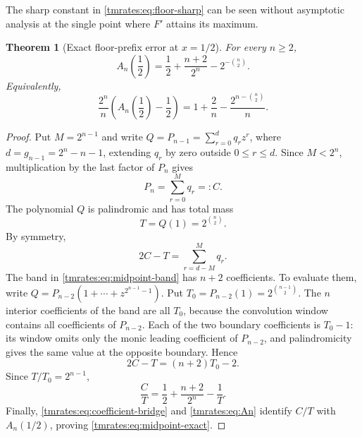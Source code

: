 \documentclass[11pt,oneside]{article}
\newtheorem{theorem}{Theorem}[section]
\theoremstyle{definition}
\theoremstyle{remark}
\begin{document}
The sharp constant in \eqref{tmrates:eq:floor-sharp} can be seen without asymptotic analysis at the
single point where $F'$ attains its maximum.

\begin{theorem}[Exact floor-prefix error at $x=1/2$]
\label{tmrates:thm:midpoint-exact}
For every $n\ge2$,
\begin{equation}
 A_n\!\left(\frac12\right)
 =\frac12+\frac{n+2}{2^n}-2^{-\binom n2}.                 \label{tmrates:eq:midpoint-exact}
\end{equation}
Equivalently,
\begin{equation}
 \frac{2^n}{n}
 \left(A_n\!\left(\frac12\right)-\frac12\right)
 =1+\frac2n-\frac{2^{n-\binom n2}}n.                     \label{tmrates:eq:midpoint-scaled}
\end{equation}
\end{theorem}

\begin{proof}
Put $M=2^{n-1}$ and write $Q=P_{n-1}=\sum_{r=0}^{d}q_rz^r$, where
$d=g_{n-1}=2^n-n-1$, extending $q_r$ by zero outside $0\le r\le d$.  Since $M<2^n$,
multiplication by the last factor of $P_n$ gives
\begin{equation}
 [z^M]P_n=\sum_{r=0}^{M}q_r=:C.                            \label{tmrates:eq:midpoint-C}
\end{equation}
The polynomial $Q$ is palindromic and has total mass
\begin{equation}
 T=Q(1)=2^{\binom n2}.                                     \label{tmrates:eq:midpoint-T}
\end{equation}
By symmetry,
\begin{equation}
 2C-T=\sum_{r=d-M}^{M}q_r.                                 \label{tmrates:eq:midpoint-band}
\end{equation}
The band in \eqref{tmrates:eq:midpoint-band} has $n+2$ coefficients.  To evaluate them, write
$Q=P_{n-2}(1+\cdots+z^{2^{n-1}-1})$.  Put
$T_0=P_{n-2}(1)=2^{\binom{n-1}{2}}$.  The $n$ interior coefficients of the band are all
$T_0$, because the convolution window contains all coefficients of $P_{n-2}$.  Each of the
two boundary coefficients is $T_0-1$: its window omits only the monic leading coefficient of
$P_{n-2}$, and palindromicity gives the same value at the opposite boundary.  Hence
\begin{equation}
 2C-T=(n+2)T_0-2.                                         \label{tmrates:eq:midpoint-band-value}
\end{equation}
Since $T/T_0=2^{n-1}$,
\[
 \frac CT=\frac12+\frac{n+2}{2^n}-\frac1T.
\]
Finally, \eqref{tmrates:eq:coefficient-bridge} and \eqref{tmrates:eq:An} identify $C/T$ with
$A_n(1/2)$, proving \eqref{tmrates:eq:midpoint-exact}.
\end{proof}
\end{document}
